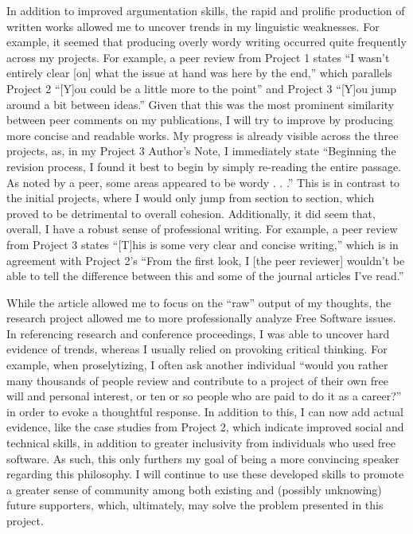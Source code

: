 \begin{justify}
  \hspace{.5in} In addition to improved argumentation skills, the rapid and prolific production of written works allowed me to uncover trends in my linguistic weaknesses. For example, it seemed that producing overly wordy writing occurred quite frequently across my projects. For example, a peer review from Project 1 states ``I wasn't entirely clear [on] what the issue at hand was here by the end,'' which parallels Project 2 ``[Y]ou could be a little more to the point'' and Project 3 ``[Y]ou jump around a bit between ideas.'' Given that this was the most prominent similarity between peer comments on my publications, I will try to improve by producing more concise and readable works. My progress is already visible across the three projects, as, in my Project 3 Author's Note, I immediately state ``Beginning the revision process, I found it best to begin by simply re-reading the entire passage. As noted by a peer, some areas appeared to be wordy . . .'' This is in contrast to the initial projects, where I would only jump from section to section, which proved to be detrimental to overall cohesion. Additionally, it did seem that, overall, I have a robust sense of professional writing. For example, a peer review from Project 3 states ``[T]his is some very clear and concise writing,'' which is in agreement with Project 2's ``From the first look, I [the peer reviewer] wouldn't be able to tell the difference between this and some of the journal articles I've read.''

  \hspace{.5in} While the article allowed me to focus on the ``raw'' output of my thoughts, the research project allowed me to more professionally analyze Free Software issues. In referencing research and conference proceedings, I was able to uncover hard evidence of trends, whereas I usually relied on provoking critical thinking. For example, when proselytizing, I often ask another individual ``would you rather many thousands of people review and contribute to a project of their own free will and personal interest, or ten or so people who are paid to do it as a career?'' in order to evoke a thoughtful response. In addition to this, I can now add actual evidence, like the case studies from Project 2, which indicate improved social and technical skills, in addition to greater inclusivity from individuals who used free software. As such, this only furthers my goal of being a more convincing speaker regarding this philosophy. I will continue to use these developed skills to promote a greater sense of community among both existing and (possibly unknowing) future supporters, which, ultimately, may solve the problem presented in this project.


\end{justify}
